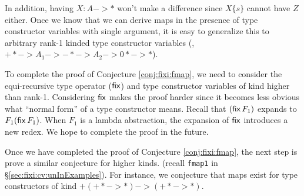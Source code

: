 In addition, having $X : A -> *$ won't make a difference since $X\{s\}$
cannot have $Z$ either. Once we know that we can derive maps in the presence
of type constructor variables with single argument, it is easy to generalize
this to arbitrary rank-1 kinded type constructor variables
(\eg, $+* -> A_1 -> -* -> A_2 -> 0* -> *$).

To complete the proof of Conjecture \ref{conj:fixi:fmap}, we need to
consider the equi-recursive type operator ($\mathsf{fix}$) and type constructor
variables of kind higher than rank-1. Considering $\mathsf{fix}$ makes the proof harder
since it becomes less obvious what ``normal form'' of a type constructor means.
Recall that $(\mathsf{fix}\,F_1)$ expands to $F_1(\mathsf{fix}\,F_1)$.  When $F_1$ is
a lambda abstraction, the expansion of $\mathsf{fix}$ introduces a new redex.
We hope to complete the proof in the future.

Once we have completed the proof of Conjecture \ref{conj:fixi:fmap},
the next step is prove a similar conjecture for higher kinds.
(recall \texttt{fmap1} in \S\ref{sec:fixi:cv:unInExamples}).
For instance, we conjecture that maps exist for type constructors
of kind $+(+* -> *) -> (+* -> *)$.


